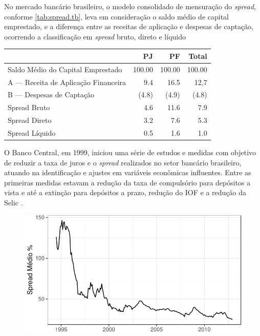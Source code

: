 \documentclass[12pt,12pt,openright,oneside,a4paper,chapter=TITLE,section=TITLE,subsection=TITLE,subsubsection=TITLE,english,french,spanish,portugues,sumario=tradicional]{abntex2}
\begin{document}
No mercado bancário brasileiro, o modelo consolidado de mensuração do \emph{spread},
conforme \autoref{tab:spread.tb}, leva em consideração o saldo médio de capital
emprestado, e a diferença entre as receitas de aplicação e despesas de
captação, ocorrendo a classificação em \emph{spread} bruto, direto e líquido
\cite{fipecafi:2005}

\begin{table}[b]
 \centering
    \label{tab:spread.tb}
     \begin{tabular}{l|r|r|r}
      \hline
                                           &   PJ   &   PF    & Total \\
       \hline
       Saldo Médio do Capital Emprestado   & 100.00 & 100.00  & 100.00 \\
       A — Receita de Aplicação Financeira & 9.4    & 16.5    & 12,7   \\
       B — Despesas de Captação            & (4.8)  & (4.9)   & (4.8)  \\   
       Spread Bruto                        & 4.6    & 11.6    & 7.9    \\
       Spread Direto                       & 3.2    & 7.6     & 5.3    \\
       Spread Líquido                      & 0.5    & 1.6     & 1.0    \\
       \hline
       \end{tabular}
\end{table}

O Banco Central, em 1999, iniciou uma série de estudos e medidas com objetivo
de reduzir a taxa de juros e o \emph{spread} realizados no setor bancário
brasileiro, atuando na identificação e ajustes em variáveis econômicas
influentes. Entre as primeiras medidas estavam a redução da taxa de compulsório
para depósitos a vista e até a extinção para depósitos a prazo, redução do IOF
e a redução da Selic \cite{BCB:2000}.

\begin{figure}

\begin{center}\includegraphics{12-exportedfigures/average spread-1} \end{center}
\label{fig:spread2012}
\end{figure}
\end{document}
